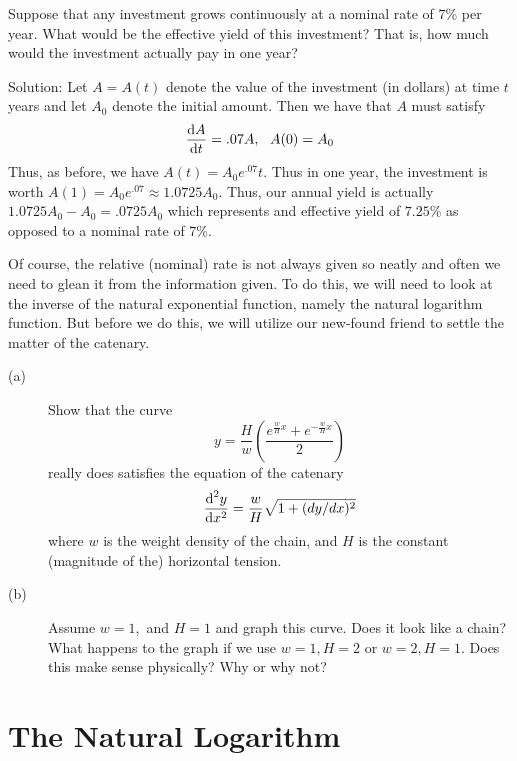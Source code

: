 \begin{myexample}
  Suppose that any investment grows continuously at a nominal rate of
  $7$\% per year.  What would be the effective yield of this
  investment?  That is, how much would the investment actually pay in
  one year?

  Solution: Let $A=A(t)$ denote the value of the investment (in dollars)
  at time $t$ years and let $A_0$ denote the initial amount.  Then we have
  that $A$ must satisfy
  $$
  \dfdx{A}{t}=.07A,\ \  A(0)=A_0
  $$
  Thus, as before, we have $A(t)=A_0e^.07t.$  Thus in one year, the
  investment is worth $A(1)=A_0e^.07\approx 1.0725A_0.$  Thus, our annual
  yield is actually $1.0725A_0-A_0=.0725A_0$ which represents and
  effective yield of $7.25$\% as opposed to a nominal rate of $7$\%.


  Of course, the relative (nominal) rate is not always given so neatly
  and often we need to glean it from the information given.  To do
  this, we will need to look at the inverse of the natural exponential
  function, namely the natural logarithm function.  But before we do
  this, we will utilize our new-found friend to settle the matter of
  the catenary.
\end{myexample}
\begin{embeddedproblem}{}
  \begin{description}
  \item[(a)] Show that the curve
  $$
  y=\frac{H}{w} \left(\frac{e^{\frac{w}{H}x}+e^{-\frac{w}{H}
        x}}{2}\right)
  $$
  really does satisfies the equation of the catenary
  $$
  \frac{\text{d}^{2}{y}}{\text{d}{x}^{2}}=\frac{w}{H} \sqrt{1+(dy/dx)^2}
  $$
  where $w$ is the weight density of the chain, and $H$ is the
  constant (magnitude of the) horizontal tension.
\item[(b)]   Assume $w=1,$ and  $H=1$ and graph this curve.  Does it look like a chain?
  What happens to the graph if we use $w=1, H=2$ or $w=2, H=1.$  Does this
  make sense physically?  Why or why not?
\end{description}

\end{embeddedproblem}

\section{The Natural Logarithm}
\label{sec:natural-logarithm-1}

